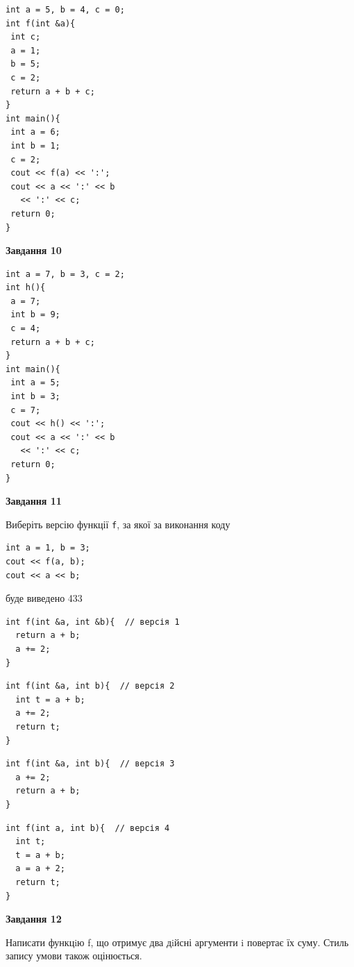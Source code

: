 \documentclass[12pt, ukrainian]{article}
\def\code#1{\Verb!#1!}
\begin{document}
{\begin {large}
\begin{minipage}[t]{7.0cm}
\begin{verbatim}
int a = 5, b = 4, c = 0;
int f(int &a){
 int c;
 a = 1;
 b = 5;
 c = 2;
 return a + b + c;
}
int main(){
 int a = 6;
 int b = 1;
 c = 2;
 cout << f(a) << ':';
 cout << a << ':' << b 
   << ':' << c;
 return 0;
}
\end{verbatim}



\begin{center}
\textbf{Завдання 10}
\end{center}
\vspace{-8mm}

\begin{verbatim}
int a = 7, b = 3, c = 2;
int h(){
 a = 7;
 int b = 9;
 c = 4;
 return a + b + c;
}
int main(){
 int a = 5;
 int b = 3;
 c = 7;
 cout << h() << ':';
 cout << a << ':' << b 
   << ':' << c;
 return 0;
}
\end{verbatim}

\end{minipage}
\vline \hspace{1mm}
\begin{minipage}[t]{11.0cm}

\begin{center}
\textbf{Завдання 11}
\end{center}
Виберіть версію функції \code{f}, за якої за виконання коду
\begin{verbatim}
int a = 1, b = 3;
cout << f(a, b);
cout << a << b;
\end{verbatim}

буде виведено 433

\begin{verbatim}
int f(int &a, int &b){  // версія 1
  return a + b;
  a += 2;
}
\end{verbatim}

\vspace{-8mm}\begin{verbatim}
int f(int &a, int b){  // версія 2
  int t = a + b;
  a += 2;
  return t;
}
\end{verbatim}

\vspace{-8mm}\begin{verbatim}
int f(int &a, int b){  // версія 3
  a += 2;
  return a + b;
}
\end{verbatim}

\vspace{-8mm}\begin{verbatim}
int f(int a, int b){  // версія 4
  int t;
  t = a + b;
  a = a + 2;
  return t;
}
\end{verbatim}



\begin{center}
\textbf{Завдання 12}
\end{center}

Написати функцiю f, що отримує два дiйсні аргументи i повертає їх суму. Стиль запису умови також оцінюється.\par

\end{minipage}

\end {large}}
\newpage
\end{document}
